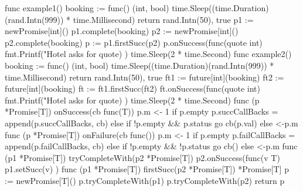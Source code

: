 \documentclass[landscape, a4paper]{article}
\begin{document}
\begin{minipage}[t]{0.19\linewidth}
{\begin{dnumberedcodebox}[minted language=go,minted options={autogobble, fontsize=\large}, box align=top]
        func example1() {
            booking := func() (int, bool) {
                time.Sleep((time.Duration)(rand.Intn(999))
                  * time.Millisecond)
                return rand.Intn(50), true
            }
            p1 := newPromise[int]()
            p1.complete(booking)
            p2 := newPromise[int]()
            p2.complete(booking)
            p := p1.firstSucc(p2)
            p.onSuccess(func(quote int) {
                fmt.Printf("Hotel asks for %
                  quote)
            })
            time.Sleep(2 * time.Second)
        }
        func example2() {
            booking := func() (int, bool) {
                time.Sleep((time.Duration)(rand.Intn(999)) 
                  * time.Millisecond)
                return rand.Intn(50), true
            }
            ft1 := future[int](booking)
            ft2 := future[int](booking)
            ft := ft1.firstSucc(ft2)
            ft.onSuccess(func(quote int) {
                fmt.Printf("Hotel asks for %
                  quote)
            })
            time.Sleep(2 * time.Second)
        }
        func (p *Promise[T]) onSuccess(cb func(T)) {
            p.m <- 1
            if p.empty {
                p.succCallBacks = append(p.succCallBacks, 
                  cb)
            } else if !p.empty && p.status {
                go cb(p.val)
            } else { }
            <-p.m
        }
        func (p *Promise[T]) onFailure(cb func()) {
            p.m <- 1
            if p.empty {
                p.failCallBacks = append(p.failCallBacks, 
                  cb)
            } else if !p.empty && !p.status {
                go cb()
            } else {}
            <-p.m
        }
        func (p1 *Promise[T]) tryCompleteWith(p2 
          *Promise[T]) {
            p2.onSuccess(func(v T) {
                p1.setSucc(v)
            })
        }
        func (p1 *Promise[T]) firstSucc(p2 *Promise[T]) 
          *Promise[T] {
            p := newPromise[T]()
            p.tryCompleteWith(p1)
            p.tryCompleteWith(p2)
            return p
        }
        \end{dnumberedcodebox}
	}
\end{minipage}
\end{document}
